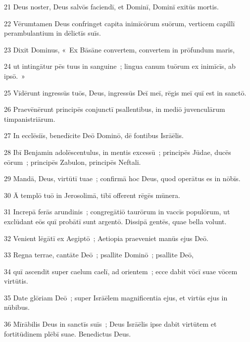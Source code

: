 \psalmVerse
  {\phantom{0}21}
  {Deus noster, Deus salvōs faciendī, et Dominī, Dominī exitūs mortis.}


\psalmVerse
  {\phantom{0}22}
  {Vērumtamen Deus confringet capita inimīcōrum suōrum, verticem capillī perambulantium in dēlictīs suīs.}


\psalmVerse
  {\phantom{0}23}
  {Dixit Dominus, «~Ex Bāsāne convertem, convertem in prōfundum maris,}


\psalmVerse
  {\phantom{0}24}
  {ut intingātur pēs tuus in sanguine~; lingua canum tuōrum ex inimīcīs, ab ipsō.~»}


\psalmVerse
  {\phantom{0}25}
  {Vīdērunt ingressūs tuōs, Deus, ingressūs Deī meī, rēgis meī quī est in sanctō.}


\psalmVerse
  {\phantom{0}26}
  {Praevēnērunt principēs conjunctī psallentibus, in mediō juvenculārum timpanistriārum.}


\psalmVerse
  {\phantom{0}27}
  {In ecclēsiīs, benedīcite Deō Dominō, dē fontibus Isrāēlis.}


\psalmVerse
  {\phantom{0}28}
  {Ibī Benjamin adolēscentulus, in mentis excessū~; principēs Jūdae, ducēs eōrum~; principēs Zabulon, principēs Neftali.}


\psalmVerse
  {\phantom{0}29}
  {Mandā, Deus, virtūtī tuae~; confirmā hoc Deus, quod operātus es in nōbīs.}


\psalmVerse
  {\phantom{0}30}
  {Ā templō tuō in Jerosolimā, tibī offerent rēgēs mūnera.}


\psalmVerse
  {\phantom{0}31}
  {Increpā ferās arundinis~; congregātiō taurōrum in vaccīs populōrum, ut exclūdant eōs quī probātī sunt argentō. Dissipā gentēs, quae bella volunt.}


\psalmVerse
  {\phantom{0}32}
  {Venient lēgātī ex Aegiptō~; Aetiopia praeveniet manūs ejus Deō.}


\psalmVerse
  {\phantom{0}33}
  {Regna terrae, cantāte Deō~; psallite Dominō~; psallite Deō,}


\psalmVerse
  {\phantom{0}34}
  {quī ascendit super caelum caelī, ad orientem~; ecce dabit vōcī suae vōcem virtūtis.}


\psalmVerse
  {\phantom{0}35}
  {Date glōriam Deō~; super Isrāēlem magnificentia ejus, et virtūs ejus in nūbibus.}


\psalmVerse
  {\phantom{0}36}
  {Mīrābilis Deus in sanctīs suīs~; Deus Isrāēlis ipse dabit virtūtem et fortitūdinem plēbī suae. Benedictus Deus.}




